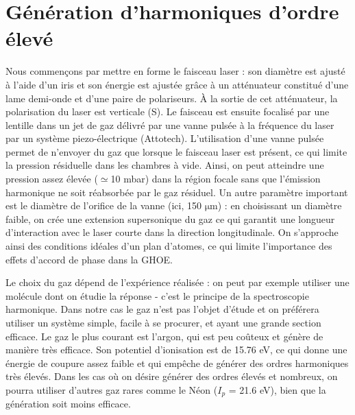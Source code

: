 \section{Génération d'harmoniques d'ordre élevé}
Nous commençons par mettre en forme le faisceau laser : son diamètre est ajusté à l'aide d'un iris et son énergie est ajustée grâce à un atténuateur constitué d'une lame demi-onde et d'une paire de polariseurs. \`{A} la sortie de cet atténuateur, la polarisation du laser est verticale (S). Le faisceau est ensuite focalisé par une lentille dans un jet de gaz délivré par une vanne pulsée à la fréquence du laser par un système piezo-électrique (Attotech). L'utilisation d'une vanne pulsée permet de n'envoyer du gaz que lorsque le faisceau laser est présent, ce qui limite la pression résiduelle dans les chambres à vide. Ainsi, on peut atteindre une pression assez élevée ($\simeq$10 mbar) dans la région focale sans que l'émission harmonique ne soit réabsorbée par le gaz résiduel. Un autre paramètre important est le diamètre de l'orifice de la vanne (ici, 150 $\si{\micro\metre}$) : en choisissant un diamètre faible, on crée une extension supersonique du gaz ce qui garantit une longueur d'interaction avec le laser courte dans la direction longitudinale. On s'approche ainsi des conditions idéales d'un plan d'atomes, ce qui limite l'importance des effets d'accord de phase dans la GHOE. \par
Le choix du gaz dépend de l'expérience réalisée : on peut par exemple utiliser une molécule dont on étudie la réponse - c'est le principe de la spectroscopie harmonique. Dans notre cas le gaz n'est pas l'objet d'étude et on préférera utiliser un système simple, facile à se procurer, et ayant une grande section efficace. Le gaz le plus courant est l'argon, qui est peu coûteux et génère de manière très efficace. Son potentiel d'ionisation est de 15.76 eV, ce qui donne une énergie de coupure assez faible et qui empêche de générer des ordres harmoniques très élevés. Dans les cas où on désire générer des ordres élevés et nombreux, on pourra utiliser d'autres gaz rares comme le Néon ($I_p$ = 21.6 eV), bien que la génération soit moins efficace.

